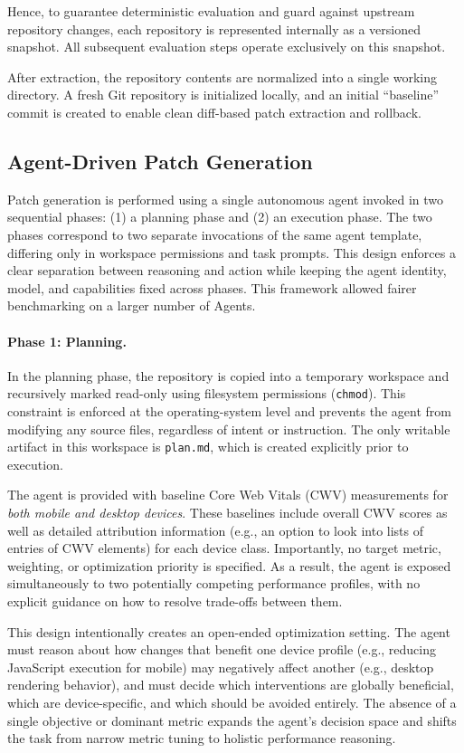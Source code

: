 Hence, to guarantee deterministic evaluation and guard against upstream repository changes, each repository is represented internally as a versioned snapshot. All subsequent evaluation steps operate exclusively on this snapshot.

After extraction, the repository contents are normalized into a single working directory. A fresh Git repository is initialized locally, and an initial ``baseline'' commit is created to enable clean diff-based patch extraction and rollback.

\subsection{Agent-Driven Patch Generation}
Patch generation is performed using a single autonomous agent invoked in two sequential phases: (1) a planning phase and (2) an execution phase. The two phases correspond to two separate invocations of the same agent template, differing only in workspace permissions and task prompts. This design enforces a clear separation between reasoning and action while keeping the agent identity, model, and capabilities fixed across phases. This framework allowed fairer benchmarking on a larger number of Agents.

\paragraph{Phase 1: Planning.}
In the planning phase, the repository is copied into a temporary workspace and recursively marked read-only using filesystem permissions (\texttt{chmod}). This constraint is enforced at the operating-system level and prevents the agent from modifying any source files, regardless of intent or instruction. The only writable artifact in this workspace is \texttt{plan.md}, which is created explicitly prior to execution.

The agent is provided with baseline Core Web Vitals (CWV) measurements for \emph{both mobile and desktop devices}. These baselines include overall CWV scores as well as detailed attribution information (e.g., an option to look into lists of entries of CWV elements) for each device class. Importantly, no target metric, weighting, or optimization priority is specified. As a result, the agent is exposed simultaneously to two potentially competing performance profiles, with no explicit guidance on how to resolve trade-offs between them.

This design intentionally creates an open-ended optimization setting. The agent must reason about how changes that benefit one device profile (e.g., reducing JavaScript execution for mobile) may negatively affect another (e.g., desktop rendering behavior), and must decide which interventions are globally beneficial, which are device-specific, and which should be avoided entirely. The absence of a single objective or dominant metric expands the agent’s decision space and shifts the task from narrow metric tuning to holistic performance reasoning.

